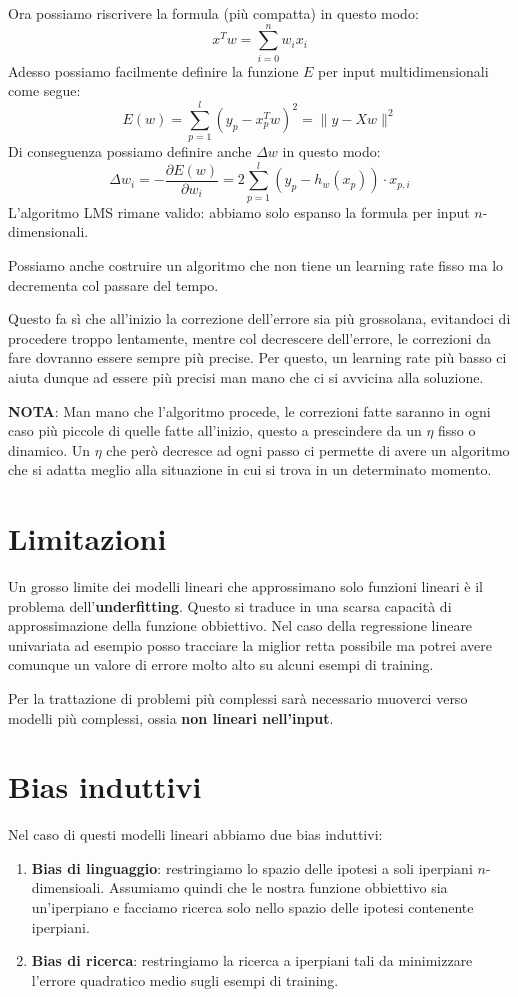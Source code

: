 Ora possiamo riscrivere la formula (pi\`u compatta) in questo modo:
\[ x^T w = \sum_{i=0}^n w_i x_i \]
Adesso possiamo facilmente definire la funzione $E$ per input multidimensionali come segue:
\[ E(w) = \sum_{p=1}^l (y_p - x^T_p w)^2 = \| y - X w \|^2 \]
Di conseguenza possiamo definire anche $\Delta w$ in questo modo:
\[ \Delta w_i = -\frac{\partial E(w)}{\partial w_i} = 2 \sum_{p=1}^l (y_p - h_w(x_p)) \cdot x_{p, i} \]
L'algoritmo LMS rimane valido: abbiamo solo espanso la formula per input $n$-dimensionali.

Possiamo anche costruire un algoritmo che non tiene un learning rate fisso ma lo decrementa col passare del tempo.

Questo fa s\`i che all'inizio la correzione dell'errore sia pi\`u grossolana, evitandoci di procedere troppo lentamente,
mentre col decrescere dell'errore, le correzioni da fare dovranno essere sempre pi\`u precise. Per questo, un learning
rate pi\`u basso ci aiuta dunque ad essere pi\`u precisi man mano che ci si avvicina alla soluzione.

\textbf{NOTA}: Man mano che l'algoritmo procede, le correzioni fatte saranno in ogni caso pi\`u piccole di quelle fatte
all'inizio, questo a prescindere da un $\eta$ fisso o dinamico. Un $\eta$ che per\`o decresce ad ogni passo ci permette di
avere un algoritmo che si adatta meglio alla situazione in cui si trova in un determinato momento.

\section{Limitazioni}
Un grosso limite dei modelli lineari che approssimano solo funzioni lineari \`e il problema dell'\textbf{underfitting}.
Questo si traduce in una scarsa capacit\`a di approssimazione della funzione obbiettivo. Nel caso della regressione
lineare univariata ad esempio posso tracciare la miglior retta possibile ma potrei avere comunque un valore di errore
molto alto su alcuni esempi di training.

Per la trattazione di problemi pi\`u complessi sar\`a necessario muoverci verso modelli pi\`u complessi, ossia
\textbf{non lineari nell'input}.

\section{Bias induttivi}
Nel caso di questi modelli lineari abbiamo due bias induttivi:
\begin{enumerate}
	\item \textbf{Bias di linguaggio}: restringiamo lo spazio delle ipotesi a soli iperpiani $n$-dimensioali.
	      Assumiamo quindi che le nostra funzione obbiettivo sia un'iperpiano e facciamo ricerca solo nello spazio delle
	      ipotesi contenente iperpiani.
	\item \textbf{Bias di ricerca}: restringiamo la ricerca a iperpiani tali da minimizzare l'errore quadratico
	      medio sugli esempi di training.
\end{enumerate}